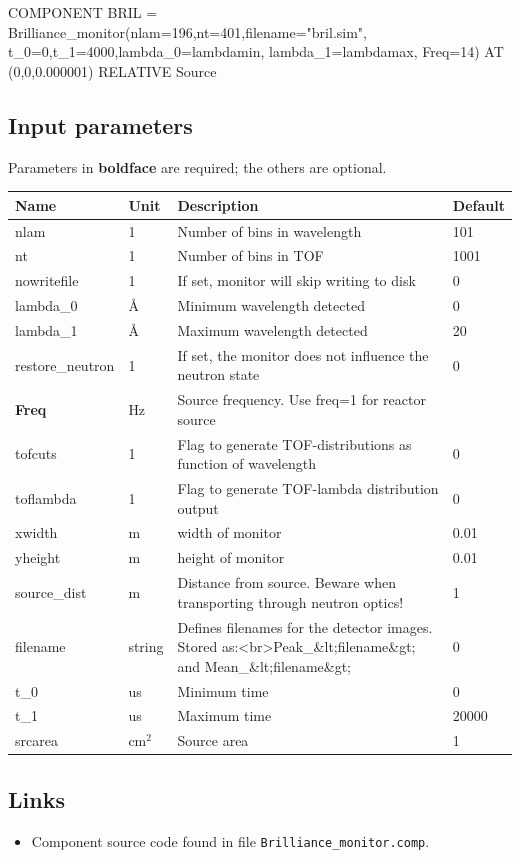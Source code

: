 COMPONENT BRIL = Brilliance\_monitor(nlam=196,nt=401,filename="bril.sim", t\_0=0,t\_1=4000,lambda\_0=lambdamin, lambda\_1=lambdamax, Freq=14) AT (0,0,0.000001) RELATIVE Source

\subsection*{Input parameters}
Parameters in \textbf{boldface} are required; the others are optional.

\begin{longtable}{p{}p{}p{}p{}}
\toprule
\textbf{Name} & \textbf{Unit} & \textbf{Description} & \textbf{Default} \\
\midrule
\endhead
nlam & 1 & Number of bins in wavelength & 101 \\
nt & 1 & Number of bins in TOF & 1001 \\
nowritefile & 1 & If set, monitor will skip writing to disk & 0 \\
lambda\_0 & \AA{} & Minimum wavelength detected & 0 \\
lambda\_1 & \AA{} & Maximum wavelength detected & 20 \\
restore\_neutron & 1 & If set, the monitor does not influence the neutron state & 0 \\
\textbf{Freq} & Hz & Source frequency. Use freq=1 for reactor source &  \\
tofcuts & 1 & Flag to generate TOF-distributions as function of wavelength & 0 \\
toflambda & 1 & Flag to generate TOF-lambda distribution output & 0 \\
xwidth & m & width of monitor & 0.01 \\
yheight & m & height of monitor & 0.01 \\
source\_dist & m & Distance from source. Beware when transporting through neutron optics! & 1 \\
filename & string & Defines filenames for the detector images. Stored as:\textless{}br\textgreater{}Peak\_\&lt;filename\&gt; and Mean\_\&lt;filename\&gt; & 0 \\
t\_0 & us & Minimum time & 0 \\
t\_1 & us & Maximum time & 20000 \\
srcarea & cm$^{2}$ & Source area & 1 \\
\bottomrule
\end{longtable}

\subsection*{Links}
\begin{itemize}
  \item Component source code found in file \texttt{Brilliance\_monitor.comp}.
\end{itemize}
